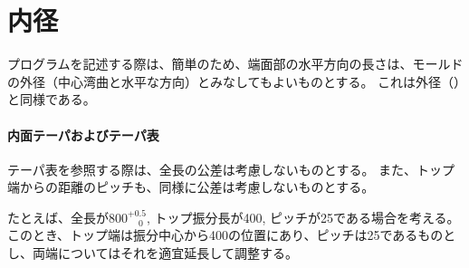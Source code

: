 \section{内径}
プログラムを記述する際は、簡単のため、端面部の水平方向の長さは、モールドの外径（中心湾曲と水平な方向）とみなしてもよいものとする。
これは外径（）と同様である。

\paragraph{内面テーパおよびテーパ表}\noindent
テーパ表を参照する際は、全長の公差は考慮しないものとする。
また、トップ端からの距離のピッチも、同様に公差は考慮しないものとする。

たとえば、全長が$800^{+0.5}_{\phantom -0}$, トップ振分長が400, ピッチが25である場合を考える。
このとき、トップ端は振分中心から400の位置にあり、ピッチは25であるものとし、両端についてはそれを適宜延長して調整する。